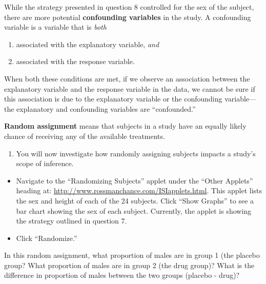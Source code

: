 \documentclass[
]{report}
\providecommand{\tightlist}{%
  \setlength{\itemsep}{0pt}\setlength{\parskip}{0pt}}
\begin{document}
\newpage

While the strategy presented in question 8 controlled for the sex of the subject, there are more potential \textbf{confounding variables} in the study. A confounding variable is a variable that is \emph{both}

\begin{enumerate}
\def\labelenumi{\arabic{enumi}.}
\tightlist
\item
  associated with the explanatory variable, \emph{and}
\item
  associated with the response variable.
\end{enumerate}

When both these conditions are met, if we observe an association between the explanatory variable and the response variable in the data, we cannot be sure if this association is due to the explanatory variable or the confounding variable---the explanatory and confounding variables are ``confounded.''

\textbf{Random assignment} means that subjects in a study have an equally likely chance of receiving any of the available treatments.

\begin{enumerate}
\def\labelenumi{\arabic{enumi}.}
\setcounter{enumi}{9}
\tightlist
\item
  You will now investigate how randomly assigning subjects impacts a study's scope of inference.
\end{enumerate}

\begin{itemize}
\item
  Navigate to the ``Randomizing Subjects'' applet under the ``Other Applets'' heading at: \url{http://www.rossmanchance.com/ISIapplets.html}. This applet lists the sex and height of each of the 24 subjects. Click ``Show Graphs'' to see a bar chart showing the sex of each subject. Currently, the applet is showing the strategy outlined in question 7.
\item
  Click ``Randomize.''
\end{itemize}

In this random assignment, what proportion of males are in group 1 (the placebo group? What proportion of males are in group 2 (the drug group)? What is the difference in proportion of males between the two groups (placebo - drug)?
\vspace{0.25in}
\end{document}
